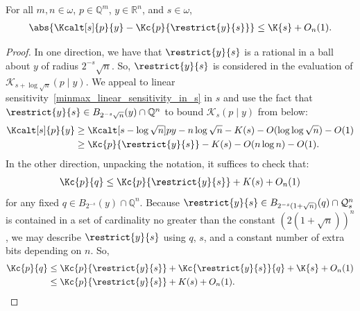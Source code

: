 \begin{lemma}
    \label{minmax_truncation_for_s}
    For all $m, n \in \omega$, $p \in \mathbb{Q}^m$, $y \in \mathbb{R}^n$, and $s \in \omega$,
    \begin{align*}
        \abs{\Kcalt[s]{p}{y} - \Kc{p}{\restrict{y}{s}}} \leq \K{s} 
        + O_n(1).
    \end{align*}
\end{lemma}
\begin{proof}
    In one direction, we have that $\restrict{y}{s}$ is a rational in a ball about $y$ of radius $2^{-s} \sqrt{n}$. So, $\restrict{y}{s}$ is considered in the evaluation of $\mathcal{K}_{s + \log \sqrt{n}}(p \mid y)$. We appeal to linear sensitivity~\ref{minmax_linear_sensitivity_in_s} in $s$ and use the fact that $\restrict{y}{s} \in B_{2^{-s} \sqrt{n}}(y) \cap \mathbb{Q}^n$ to bound $\mathcal{K}_s(p \mid y)$ from below:
    \begin{align*}
        \Kcalt[s]{p}{y} &\geq \Kcalt[s - \log \sqrt{n}]{p}{y} - n \log \sqrt{n} - K(s) - O(\log \log \sqrt{n}) - O(1)\\
        &\geq \Kc{p}{\restrict{y}{s}} - K(s) - O(n \log n) - O(1).
    \end{align*}
    In the other direction, unpacking the notation, it suffices to check that:
    \begin{align*}
        \Kc{p}{q} \leq \Kc{p}{\restrict{y}{s}} + K(s) + O_n(1)
    \end{align*}
    for any fixed $q \in B_{2^{-s}}(y) \cap \mathbb{Q}^n$. Because $\restrict{y}{s} \in B_{2^{-s} (1 + \sqrt{n})}(q) \cap \mathcal{Q}^n_s$ is contained in a set of cardinality no greater than the constant $(2(1 + \sqrt{n}))^n$, we may describe $\restrict{y}{s}$ using $q$, $s$, and a constant number of extra bits depending on $n$. So,
    \begin{align*}
        \Kc{p}{q} &\leq \Kc{p}{\restrict{y}{s}} + \Kc{\restrict{y}{s}}{q} + \K{s} + O_n(1) \\
        &\leq \Kc{p}{\restrict{y}{s}} + K(s) + O_n(1).
    \end{align*} 
\end{proof}

